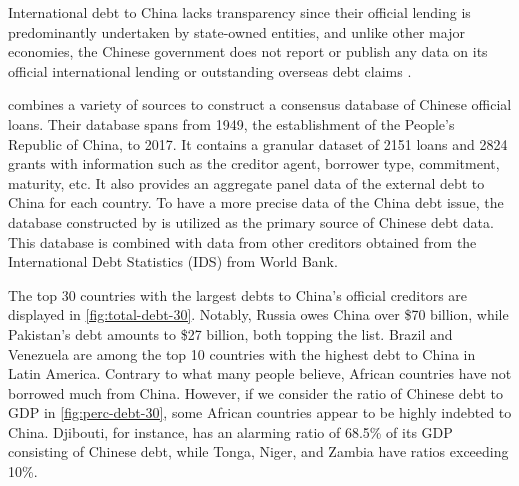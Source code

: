 International debt to China lacks transparency since their official lending is predominantly undertaken by state-owned entities, and unlike other major economies, the Chinese government does not report or publish any data on its official international lending or outstanding overseas debt claims \citep*{Horn-Reinhart-Trebesch-21}.


\citet*{Horn-Reinhart-Trebesch-21} combines a variety of sources to construct a consensus database of Chinese official loans.
Their database spans from 1949, the establishment of the People's Republic of China, to 2017. It contains a granular dataset of 2151 loans and 2824 grants with information such as the creditor agent, borrower type, commitment, maturity, etc. It also provides an aggregate panel data of the external debt to China for each country.
To have a more precise data of the China debt issue, the database constructed by \citet*{Horn-Reinhart-Trebesch-21} is utilized as the primary source of Chinese debt data. This database is combined with data from other creditors obtained from the International Debt Statistics (IDS) from World Bank.

The top 30 countries with the largest debts to China's official creditors are displayed in \autoref{fig:total-debt-30}. Notably, Russia owes China over \$70 billion, while Pakistan's debt amounts to \$27 billion, both topping the list. Brazil and Venezuela are among the top 10 countries with the highest debt to China in Latin America. Contrary to what many people believe, African countries have not borrowed much from China. However, if we consider the ratio of Chinese debt to GDP in \autoref{fig:perc-debt-30}, some African countries appear to be highly indebted to China. Djibouti, for instance, has an alarming ratio of 68.5\% of its GDP consisting of Chinese debt, while Tonga, Niger, and Zambia have ratios exceeding 10\%.

